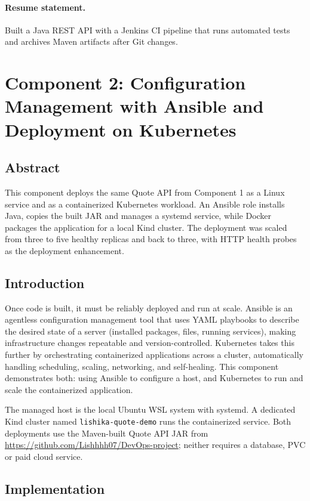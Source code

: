 \documentclass[12pt,a4paper]{article}
\begin{document}
\paragraph{Resume statement.} Built a Java REST API with a Jenkins CI pipeline that runs automated tests and archives Maven artifacts after Git changes.

\newpage
\section*{Component 2: Configuration Management with Ansible and Deployment on Kubernetes}

\subsection*{Abstract}
This component deploys the same Quote API from Component 1 as a Linux service and as a containerized Kubernetes workload. An Ansible role installs Java, copies the built JAR and manages a systemd service, while Docker packages the application for a local Kind cluster. The deployment was scaled from three to five healthy replicas and back to three, with HTTP health probes as the deployment enhancement.

\subsection*{Introduction}
Once code is built, it must be reliably deployed and run at scale. Ansible is an agentless configuration management tool that uses YAML playbooks to describe the desired state of a server (installed packages, files, running services), making infrastructure changes repeatable and version-controlled. Kubernetes takes this further by orchestrating containerized applications across a cluster, automatically handling scheduling, scaling, networking, and self-healing. This component demonstrates both: using Ansible to configure a host, and Kubernetes to run and scale the containerized application.

The managed host is the local Ubuntu WSL system with systemd. A dedicated Kind cluster named \texttt{lishika-quote-demo} runs the containerized service. Both deployments use the Maven-built Quote API JAR from \url{https://github.com/Lishhhh07/DevOps-project}; neither requires a database, PVC or paid cloud service.

\subsection*{Implementation}
\end{document}
